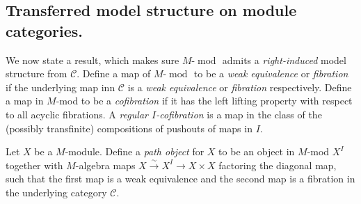 \documentclass{article}
\newcommand{\cC}{\mathcal{C}}
\newcommand{\module}[2][]{#2\text{-}\modop_{#1}}
\newcommand{\todoinline}[1]{\todo[inline]{#1}}
\DeclareMathOperator{\modop}{mod}
\theoremstyle{definition}
\theoremstyle{remark}
\begin{document}
\subsection{Transferred model structure on module categories.}
We now state a result, which makes sure $\module{M}$ admits a \textit{right-induced} model structure from $\cC$.
Define a map of $\module{M}$ to be a \textit{weak equivalence} or \textit{fibration} if the underlying map inn $\cC$ is a \textit{weak equivalence} or \textit{fibration} respectively. Define a map in $M$-mod to be a \textit{cofibration} if it has the left lifting property with respect to all acyclic fibrations.
A \textit{regular $I$-cofibration} is a map in the class of the (possibly transfinite) compositions of pushouts of maps in $I$.

Let $X$ be a $M$-module. Define a \textit{path object} for $X$ to be an object in $M$-mod $X^{I}$ together with $M$-algebra maps $X \xrightarrow{\sim} X^{I} \rightarrow X \times X$ factoring the diagonal map, such that the first map is a weak equivalence and the second map is a fibration in the underlying category $\cC$.
\end{document}
